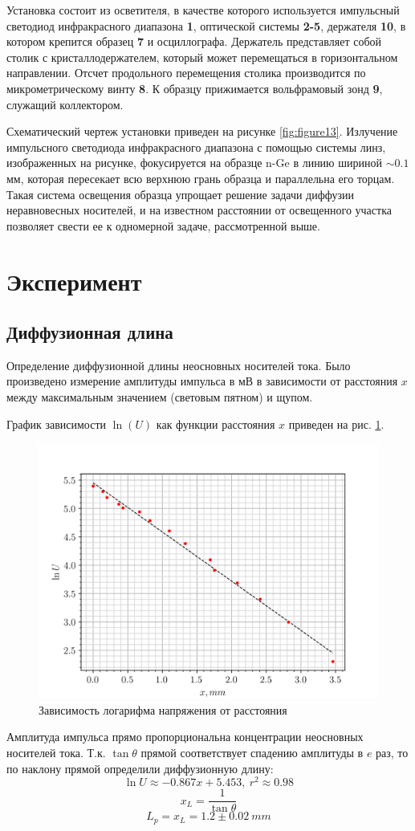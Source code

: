 Установка состоит из осветителя, в качестве которого используется импульсный светодиод инфракрасного диапазона \textbf{1}, оптической системы \textbf{2-5}, держателя \textbf{10}, в котором крепится образец \textbf{7} и осциллографа. Держатель представляет собой столик с кристаллодержателем, который может перемещаться в горизонтальном направлении. Отсчет продольного перемещения столика производится по микрометрическому винту \textbf{8}. К образцу прижимается вольфрамовый зонд \textbf{9}, служащий коллектором.

Схематический чертеж установки приведен на рисунке \ref{fig:figure13}. Излучение импульсного светодиода инфракрасного диапазона с помощью системы линз, изображенных на рисунке, фокусируется на образце n-Ge в линию шириной $\sim0.1$ мм, которая пересекает всю верхнюю грань образца и параллельна его торцам. Такая система освещения образца упрощает решение задачи диффузии неравновесных носителей, и на известном расстоянии от освещенного участка позволяет свести ее к одномерной задаче, рассмотренной выше.

\newpage
\section*{Эксперимент}

\subsection*{Диффузионная длина}
Определение диффузионной длины неосновных носителей тока. Было произведено измерение амплитуды импульса в мВ в зависимости от
расстояния $x$ между максимальным значением (световым пятном) и щупом.

График зависимости $\ln(U)$ как функции расстояния $x$ приведен на рис. \ref{fig:exp.1}.
\begin{figure}[H]
	\centering
	\includegraphics[]{graphs/task1.png}
	\caption{Зависимость логарифма напряжения от расстояния}
	\label{fig:exp.1}
\end{figure}
Амплитуда импульса прямо пропорциональна концентрации неосновных носителей тока. Т.к. $\tan \theta$ прямой соответствует
спадению амплитуды в $e$ раз, то по наклону прямой определили диффузионную длину:
$$\ln U \approx -0.867 x + 5.453,~ r^2 \approx 0.98$$
$$ x_L = \frac{1}{\tan \theta}$$
$$L_p = x_L = 1.2 \pm0.02~mm $$


